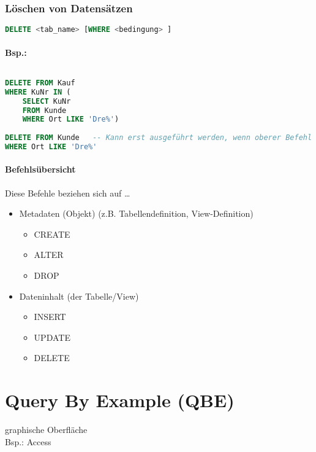 \subsubsection{Löschen von Datensätzen}
\begin{lstlisting}[language=SQL]
DELETE <tab_name> [WHERE <bedingung> ]
\end{lstlisting}
\paragraph{Bsp.:} $ $
\begin{lstlisting}[language=SQL]
DELETE FROM Kauf
WHERE KuNr IN ( 
	SELECT KuNr
	FROM Kunde
	WHERE Ort LIKE 'Dre%')
	
DELETE FROM Kunde	-- Kann erst ausgeführt werden, wenn oberer Befehl ausgeführt werden. Wegen referenzieller Integrität!
WHERE Ort LIKE 'Dre%'
\end{lstlisting}
\paragraph{Befehlsübersicht} Diese Befehle beziehen sich auf …
\begin{itemize}
\item Metadaten (Objekt) (z.B. Tabellendefinition, View-Definition)
\begin{itemize}
\item CREATE
\item ALTER
\item DROP
\end{itemize}
\item Dateninhalt (der Tabelle/View)
\begin{itemize}
\item INSERT
\item UPDATE
\item DELETE
\end{itemize}
\end{itemize}

\section{Query By Example (QBE)}
graphische Oberfläche\\
Bsp.: Access

